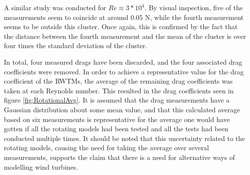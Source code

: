 A similar study was conducted for $Re \approx 3*10^4$. By visual inspection, five of the measurements seem to coincide at around 0.05 \si{\N}, while the fourth measurement seems to be outside this cluster. Once again, this is confirmed by the fact that the distance between the fourth measurement and the mean of the cluster is over four times the standard deviation of the cluster. 


In total, four measured drags have been discarded, and the four associated drag coefficients were removed. In order to achieve a representative value for the drag coefficient of the \gls{RWTM}s, the average of the remaining drag coefficients was taken at each Reynolds number. This resulted in the drag coefficients seen in figure \ref{fig:RotationalAvg}. It is assumed that the drag measurements have a Gaussian distribution about some mean value, and that this calculated average based on six measurements is representative for the average one would have gotten if all the rotating models had been tested and all the tests had been conducted multiple times. It should be noted that this uncertainty related to the rotating models, causing the need for taking the average over several measurements, supports the claim that there is a need for alternative ways of modelling wind turbines. 





